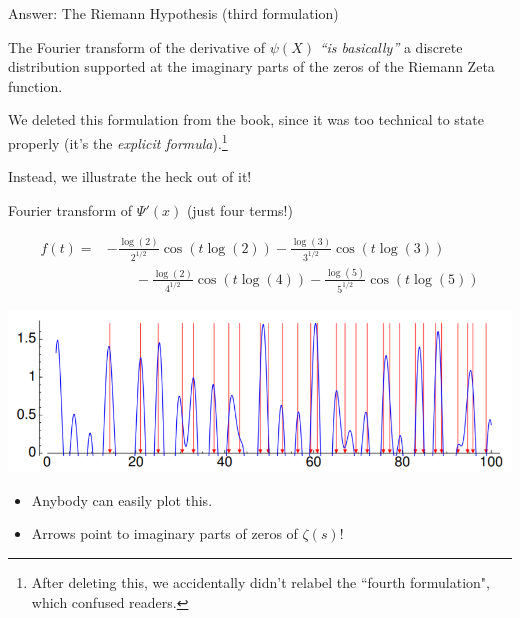 \documentclass{beamer}
\begin{document}
\begin{frame}{Answer: The Riemann Hypothesis (third formulation)}
  \begin{block}{}
    The Fourier transform
    of the derivative of $\psi(X)$ \emph{``is basically''}
    a discrete distribution supported at the imaginary parts of the
    zeros of the Riemann Zeta function.

  \end{block}
\vfill

We deleted this formulation from the book, since it was too technical to state properly (it's the {\em explicit formula}).\footnote{After deleting this, we accidentally didn't relabel the ``fourth formulation", which confused readers.}

\vfill

Instead, we illustrate the heck out of it!

\vfill

\end{frame}

\begin{frame}{Fourier transform of $\Psi'(x)$ (just four terms!)}

    \begin{align*}
   f(t) =& -{\frac{\log(2)}{2^{1/2}}}\cos(t\log(2))- {\frac{\log(3)}{3^{1/2}}}\cos(t\log(3))\\
     &\qquad -{\frac{\log(2)}{4^{1/2}}}\cos(t\log(4))-{\frac{\log(5)}{5^{1/2}}}\cos(t\log(5))
  \end{align*}

\includegraphics[height=.42\textheight]{pics/prime-power-freq-5}

\vfill

\begin{itemize}
\item Anybody can easily plot this.
\item Arrows point to imaginary parts of zeros of $\zeta(s)$!
\end{itemize}

\end{frame}
\end{document}
